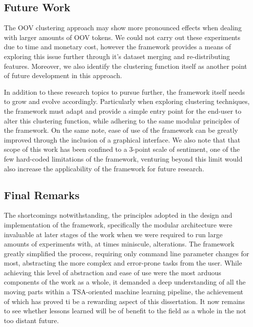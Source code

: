 \documentclass[../../fyp.tex]{subfiles}
\begin{document}
\subsection{Future Work}
The OOV clustering approach may show more pronounced effects when dealing with larger amounts of OOV tokens. We could not carry out these experiments due to time and monetary cost, however the framework provides a means of exploring this issue further through it's dataset merging and re-distributing features. Moreover, we also identify the clustering function itself as another point of future development in this approach. 

In addition to these research topics to pursue further, the framework itself needs to grow and evolve accordingly. Particularly when exploring clustering techniques, the framework must adapt and provide a simple entry point for the end-user to alter this clustering function, while adhering to the same modular principles of the framework. On the same note, ease of use of the framework can be greatly improved through the inclusion of a graphical interface. We also note that that scope of this work has been confined to a 3-point scale of sentiment, one of the few hard-coded limitations of the framework, venturing beyond this limit would also increase the applicability of the framework for future research. 

\subsection{Final Remarks}
The shortcomings notwithstanding, the principles adopted in the design and implementation of the framework, specifically the modular architecture were invaluable at later stages of the work when we were required to run large amounts of experiments with, at times miniscule, alterations. The framework greatly simplified the process, requiring only command line parameter changes for most, abstracting the more complex and error-prone tasks from the user. While achieving this level of abstraction and ease of use were the most arduous components of the work as a whole, it demanded a deep understanding of all the moving parts within a TSA-oriented machine learning pipeline, the achievement of which has proved ti be a rewarding aspect of this dissertation. It now remains to see whether lessons learned will be of benefit to the field as a whole in the not too distant future.

% 

% 
\end{document}
